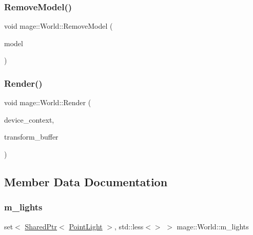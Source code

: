 \subsubsection{\texorpdfstring{Remove\+Model()}{RemoveModel()}\hspace{0.1cm}{\footnotesize\ttfamily [2/2]}}
{\footnotesize\ttfamily void mage\+::\+World\+::\+Remove\+Model (\begin{DoxyParamCaption}\item[{\hyperlink{namespacemage_a1e01ae66713838a7a67d30e44c67703e}{Shared\+Ptr}$<$ \hyperlink{classmage_1_1_model}{Model} $>$}]{model }\end{DoxyParamCaption})}

\hypertarget{classmage_1_1_world_a622c386b528b34571e3e5e9d207fcada}{}\label{classmage_1_1_world_a622c386b528b34571e3e5e9d207fcada} 
\subsubsection{\texorpdfstring{Render()}{Render()}}
{\footnotesize\ttfamily void mage\+::\+World\+::\+Render (\begin{DoxyParamCaption}\item[{I\+D3\+D11\+Device\+Context2 \&}]{device\+\_\+context,  }\item[{const \hyperlink{structmage_1_1_transform_buffer}{Transform\+Buffer} \&}]{transform\+\_\+buffer }\end{DoxyParamCaption})}



\subsection{Member Data Documentation}
\hypertarget{classmage_1_1_world_acb9bceb4598a9d572f026cb65d850de5}{}\label{classmage_1_1_world_acb9bceb4598a9d572f026cb65d850de5} 
\subsubsection{\texorpdfstring{m\+\_\+lights}{m\_lights}}
{\footnotesize\ttfamily set$<$ \hyperlink{namespacemage_a1e01ae66713838a7a67d30e44c67703e}{Shared\+Ptr}$<$ \hyperlink{classmage_1_1_point_light}{Point\+Light} $>$, std\+::less$<$$>$ $>$ mage\+::\+World\+::m\+\_\+lights\hspace{0.3cm}{\ttfamily [private]}}

